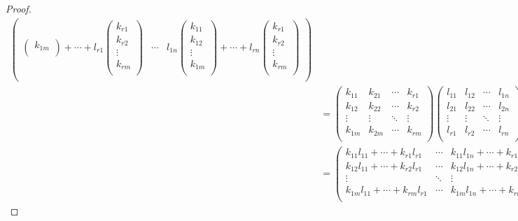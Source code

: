 \documentclass[dvipdfmx]{jsarticle}
\begin{document}
\begin{proof}
\begin{align*}
\begin{pmatrix}
\begin{pmatrix}
k_{1m} \\
\end{pmatrix} + \cdots + l_{r1}\begin{pmatrix}
k_{r1} \\
k_{r2} \\
 \vdots \\
k_{rm} \\
\end{pmatrix} & \cdots & l_{1n}\begin{pmatrix}
k_{11} \\
k_{12} \\
 \vdots \\
k_{1m} \\
\end{pmatrix} + \cdots + l_{rn}\begin{pmatrix}
k_{r1} \\
k_{r2} \\
 \vdots \\
k_{rm} \\
\end{pmatrix} \\
\end{pmatrix}\\
&= \begin{pmatrix}
k_{11} & k_{21} & \cdots & k_{r1} \\
k_{12} & k_{22} & \cdots & k_{r2} \\
 \vdots & \vdots & \ddots & \vdots \\
k_{1m} & k_{2m} & \cdots & k_{rm} \\
\end{pmatrix}\begin{pmatrix}
l_{11} & l_{12} & \cdots & l_{1n} \\
l_{21} & l_{22} & \cdots & l_{2n} \\
 \vdots & \vdots & \ddots & \vdots \\
l_{r1} & l_{r2} & \cdots & l_{rn} \\
\end{pmatrix}\\
&= \begin{pmatrix}
k_{11}l_{11} + \cdots + k_{r1}l_{r1} & \cdots & k_{11}l_{1n} + \cdots + k_{r1}l_{rn} \\
k_{12}l_{11} + \cdots + k_{r2}l_{r1} & \cdots & k_{12}l_{1n} + \cdots + k_{r2}l_{rn} \\
 \vdots & \ddots & \vdots \\
k_{1m}l_{11} + \cdots + k_{rm}l_{r1} & \cdots & k_{1m}l_{1n} + \cdots + k_{rm}l_{rn} \\

\end{pmatrix}
\end{align*}
\end{proof}
\end{document}

